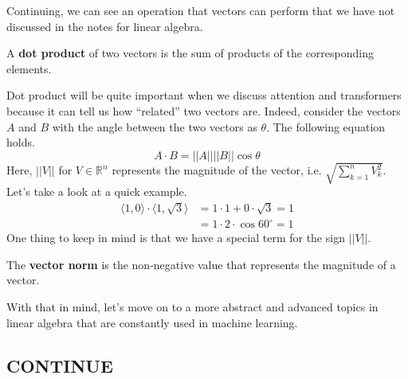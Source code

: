\documentclass[../../../main.tex]{subfiles}
\begin{document}
\begin{figure}[H]
\centering
{}
\end{figure}

Continuing, we can see an operation that vectors can perform that
we have not discussed in the notes for linear algebra.

\begin{definition}{}{}
A \textbf{dot product} of two vectors is the sum of products of the
corresponding elements.
\end{definition}

Dot product will be quite important when we discuss attention and
transformers because it can tell us how ``related'' two vectors are.
Indeed, consider the vectors $A$ and $B$ with the angle between the
two vectors as $\theta$. The following equation holds.
\[
A \cdot B = ||A|| ||B|| \cos\theta
\]
Here, $||V||$ for $V \in \mathbb{R}^n$ represents the magnitude of the
vector, i.e. $\sqrt{\sum_{k=1}^n V_k^2}$. Let's take a look at a quick
example.
\begin{align*}
    \langle 1, 0 \rangle \cdot \langle 1, \sqrt{3} \rangle
    &= 1 \cdot 1 + 0 \cdot \sqrt{3} = 1 \\
    &= 1 \cdot 2 \cdot \cos60^\circ = 1
\end{align*}
One thing to keep in mind is that we have a special term for the
sign $||V||$.

\begin{definition}{}{}
The \textbf{vector norm} is the non-negative value that represents
the magnitude of a vector.
\end{definition}

With that in mind, let's move on to a more abstract and advanced
topics in linear algebra that are constantly used in machine learning.

\subsection{CONTINUE}
\end{document}
